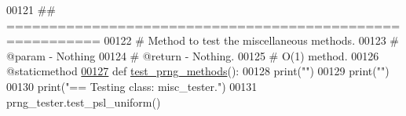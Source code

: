 \begin{DoxyCode}
00121     \textcolor{comment}{## =========================================================}
00122     \textcolor{comment}{#   Method to test the miscellaneous methods.}
00123     \textcolor{comment}{#   @param - Nothing}
00124     \textcolor{comment}{#   @return - Nothing.}
00125     \textcolor{comment}{#   O(1) method.}
00126     @staticmethod
\hypertarget{pseudorandom__number__generator__tester_8py_source_l00127}{}\hyperlink{classrandom__process__models_1_1pseudorandom__number__generator__tester_1_1prng__tester_aff9e5a07e94168e1eabd25b7f3a4eb32}{00127}     \textcolor{keyword}{def }\hyperlink{classrandom__process__models_1_1pseudorandom__number__generator__tester_1_1prng__tester_aff9e5a07e94168e1eabd25b7f3a4eb32}{test\_prng\_methods}():
00128         print(\textcolor{stringliteral}{""})
00129         print(\textcolor{stringliteral}{""})
00130         print(\textcolor{stringliteral}{"==   Testing class: misc\_tester."})
00131         prng\_tester.test\_psl\_uniform()
\end{DoxyCode}
